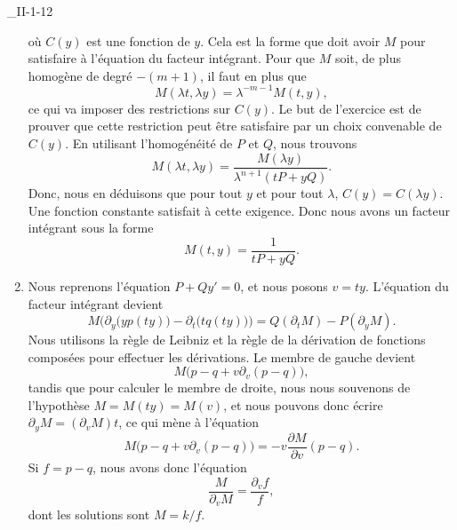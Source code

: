 \begin{corrige}{_II-1-12}
\begin{enumerate}
\begin{equation}
		      \end{equation}
		      où $C(y)$ est une fonction de $y$. Cela est la forme que doit avoir $M$ pour satisfaire à l'équation du facteur intégrant. Pour que $M$ soit, de plus homogène de degré $-(m+1)$, il faut en plus que
		      \begin{equation}
			      M(\lambda t,\lambda y)=\lambda^{-m-1}M(t,y),
		      \end{equation}
		      ce qui va imposer des restrictions sur $C(y)$. Le but de l'exercice est de prouver que cette restriction peut être satisfaire par un choix convenable de $C(y)$. En utilisant l'homogénéité de $P$ et $Q$, nous trouvons
		      \begin{equation}
			      M(\lambda t,\lambda y)=\frac{ M(\lambda y) }{ \lambda^{n+1}(tP+yQ) }.
		      \end{equation}
		      Donc, nous en déduisons que pour tout $y$ et pour tout $\lambda$, $C(y)=C(\lambda y)$. Une fonction constante satisfait à cette exigence. Donc nous avons un facteur intégrant sous la forme
		      \begin{equation}
			      M(t,y)=\frac{1}{ tP+yQ }.
		      \end{equation}

		\item
		      Nous reprenons l'équation $P+Qy'=0$, et nous posons $v=ty$. L'équation du facteur intégrant devient
		      \begin{equation}
			      M\Big( \partial_y \big( yp(ty) \big)-\partial_t \big( tq(ty) \big)  \Big)=Q(\partial_t M)-P(\partial_y M).
		      \end{equation}
		      Nous utilisons la règle de Leibniz et la règle de la dérivation de fonctions composées pour effectuer les dérivations. Le membre de gauche devient
		      \begin{equation}
			      M\big(p-q+v\partial_v(p-q)\big),
		      \end{equation}
		      tandis que pour calculer le membre de droite, nous nous souvenons de l'hypothèse $M=M(ty)=M(v)$, et nous pouvons donc écrire $\partial_y M=(\partial_vM)t$, ce qui mène à l'équation
		      \begin{equation}
			      M\big(p-q+v\partial_v(p-q)\big)=-v\frac{ \partial M }{ \partial v }(p-q).
		      \end{equation}
		      Si $f=p-q$, nous avons donc l'équation
		      \begin{equation}
			      \frac{ M }{ \partial_vM }=\frac{ \partial_vf }{ f },
		      \end{equation}
		      dont les solutions sont $M=k/f$.



\end{enumerate}
\end{corrige}
